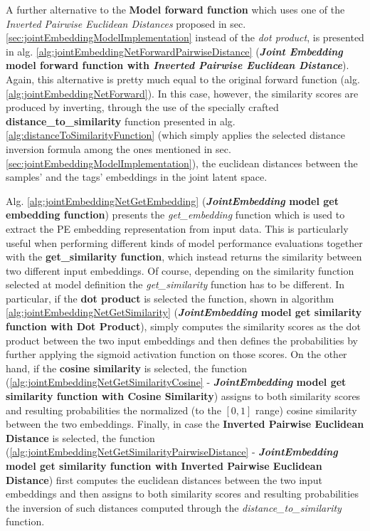 \documentclass[pdfa%
,cucitura%
]{toptesi}
\begin{document}
A further alternative to the \textbf{Model forward function} which uses one of the \textit{Inverted Pairwise Euclidean Distances} proposed in sec. \ref{sec:jointEmbeddingModelImplementation} instead of the \textit{dot product}, is presented in alg. \ref{alg:jointEmbeddingNetForwardPairwiseDistance} (\textbf{\textit{Joint Embedding} model forward function with \textit{Inverted Pairwise Euclidean Distance}}). Again, this alternative is pretty much equal to the original forward function (alg. \ref{alg:jointEmbeddingNetForward}). In this case, however, the similarity scores are produced by inverting, through the use of the specially crafted \textbf{distance\_to\_similarity} function presented in alg. \ref{alg:distanceToSimilarityFunction} (which simply applies the selected distance inversion formula among the ones mentioned in sec. \ref{sec:jointEmbeddingModelImplementation}), the euclidean distances between the samples' and the tags' embeddings in the joint latent space.

Alg. \ref{alg:jointEmbeddingNetGetEmbedding} (\textbf{\textit{JointEmbedding} model get embedding function}) presents the \textit{get\_embedding} function which is used to extract the PE embedding representation from input data. This is particularly useful when performing different kinds of model performance evaluations together with the \textbf{get\_similarity function}, which instead returns the similarity between two different input embeddings. Of course, depending on the similarity function selected at model definition the \textit{get\_similarity} function has to be different. In particular, if the \textbf{dot product} is selected the function, shown in algorithm \ref{alg:jointEmbeddingNetGetSimilarity} (\textbf{\textit{JointEmbedding} model get similarity function with Dot Product}), simply computes the similarity scores as the dot product between the two input embeddings and then defines the probabilities by further applying the sigmoid activation function on those scores. On the other hand, if the \textbf{cosine similarity} is selected, the function (\ref{alg:jointEmbeddingNetGetSimilarityCosine} - \textbf{\textit{JointEmbedding} model get similarity function with Cosine Similarity}) assigns to both similarity scores and resulting probabilities the normalized (to the $[0,1]$ range) cosine similarity between the two embeddings. Finally, in case the \textbf{Inverted Pairwise Euclidean Distance} is selected, the function (\ref{alg:jointEmbeddingNetGetSimilarityPairwiseDistance} - \textbf{\textit{JointEmbedding} model get similarity function with Inverted Pairwise Euclidean Distance}) first computes the euclidean distances between the two input embeddings and then assigns to both similarity scores and resulting probabilities the inversion of such distances computed through the \textit{distance\_to\_similarity} function.
\end{document}
